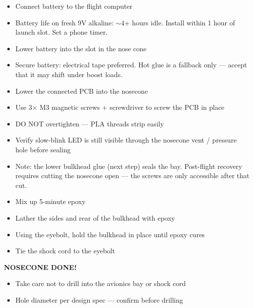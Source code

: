\documentclass[11pt,a4paper,oneside]{report}
\newcommand{\done}[1]{\bigskip\begin{center}\sffamily\bfseries\Large\textcolor{rocketred}{#1}\end{center}\bigskip}
\begin{document}
\begin{itemize}
  \item Connect battery to the flight computer
  \item Battery life on fresh 9V alkaline: $\sim$4+ hours idle. Install within 1 hour of launch slot. Set a phone timer.
  \item Lower battery into the slot in the nose cone
  \item Secure battery: electrical tape preferred. Hot glue is a fallback only --- accept that it may shift under boost loads.
\end{itemize}

\begin{itemize}
  \item Lower the connected PCB into the nosecone
  \item Use 3$\times$ M3 magnetic screws + screwdriver to screw the PCB in place
  \item DO NOT overtighten --- PLA threads strip easily
  \item Verify slow-blink LED is still visible through the nosecone vent / pressure hole before sealing
  \item Note: the lower bulkhead glue (next step) seals the bay. Post-flight recovery requires cutting the nosecone open --- the screws are only accessible after that cut.
\end{itemize}

\begin{itemize}
  \item Mix up 5-minute epoxy
  \item Lather the sides and rear of the bulkhead with epoxy
  \item Using the eyebolt, hold the bulkhead in place until epoxy cures
  \item Tie the shock cord to the eyebolt
\end{itemize}

\done{NOSECONE DONE!}


\begin{itemize}
  \item Take care not to drill into the avionics bay or shock cord
  \item Hole diameter per design spec --- confirm before drilling
\end{itemize}
\end{document}
